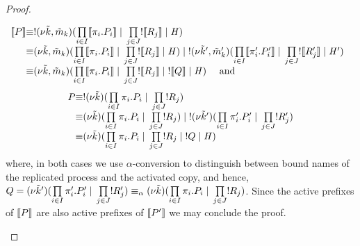 \begin{proof}
\begin{enumerate}
\[
\begin{array}{@{}c@{}c@{}l@{}}
\hspace{-2.5mm} \enc{\PP} 
& \equiv & \rep\rest{\tilde{\NK},\tilde{\NM}_\NK}(\prod\limits_{i\in I} \enc{\pi_i.\PP_i} \parop \prod\limits_{j\in J} \rep\enc{\PR_j} \parop \handler) \\
& \equiv & \rest{\tilde{\NK},\tilde{\NM}_\NK}(\prod\limits_{i\in I} \enc{\pi_i.\PP_i} \parop \prod\limits_{j\in J} \rep\enc{\PR_j} \parop \handler)
\parop \rep\rest{\tilde{\NK}',\tilde{\NM}_\NK'}(\prod\limits_{i\in I} \enc{\pi_i'.\PP_i'} \parop \prod\limits_{j\in J} \rep\enc{\PR_j'} \parop \handler')\\
& \equiv & 
\rest{\tilde{\NK},\tilde{\NM}_\NK}(\prod\limits_{i\in I} \enc{\pi_i.\PP_i} \parop \prod\limits_{j\in J} \rep\enc{\PR_j} \parop \rep\enc{\PQ} \parop \handler)\quad \text{ and }\\ 
\end{array} 
\]
\[
\begin{array}{@{}c@{}c@{}l@{}}
\PP 
& \equiv & \rep\rest{\tilde{\NK}}(\prod\limits_{i\in I} \pi_i.\PP_i \parop \prod\limits_{j\in J} \rep\PR_j ) \\
& \equiv & \rest{\tilde{\NK}}(\prod\limits_{i\in I} {\pi_i.\PP_i} \parop \prod\limits_{j\in J} \rep{\PR_j})
\parop \rep\rest{\tilde{\NK}'}(\prod\limits_{i\in I} {\pi_i'.\PP_i'} \parop \prod\limits_{j\in J} \rep{\PR_j'} )\\
& \equiv & 
\rest{\tilde{\NK}}(\prod\limits_{i\in I} {\pi_i.\PP_i} \parop \prod\limits_{j\in J} \rep{\PR_j} \parop \rep{\PQ} \parop \handler)
\end{array} 
\]
where, in both cases we use $\alpha$-conversion to distinguish between bound names of the replicated process and the activated copy, and hence, 
$Q= (\nu \tilde{k}')(\prod\limits_{i\in I} {\pi_i'.P_i'} \;|\; \prod\limits_{j\in J} ! R_j' )\equiv_\alpha(\nu \tilde{k})(\prod\limits_{i\in I} {\pi_i.P_i} \;|\; \prod\limits_{j\in J} ! R_j)$. 
Since the active prefixes of $\llbracket P \rrbracket$ are also active prefixes of $\llbracket P' \rrbracket$ we may conclude the proof.
\end{enumerate}
\end{proof}

